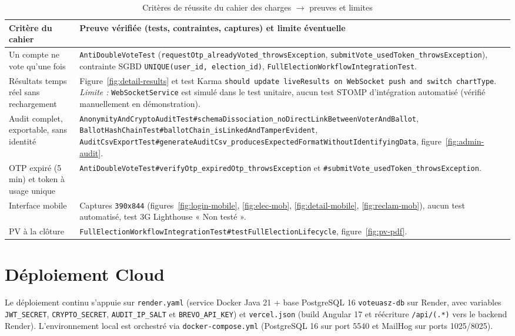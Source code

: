\begin{table}[H]
\centering
\caption{Critères de réussite du cahier des charges $\rightarrow$ preuves et limites}
\label{tab:criteres-cahier-preuve}
\small
\begin{tabularx}{\textwidth}{@{}lX@{}}
\toprule
\rowcolor{uaszlight}
\textbf{Critère du cahier} & \textbf{Preuve vérifiée (tests, contraintes, captures) et limite éventuelle} \\
\midrule
Un compte ne vote qu'une fois & \texttt{AntiDoubleVoteTest} (\texttt{requestOtp\_alreadyVoted\_throwsException}, \texttt{submitVote\_usedToken\_throwsException}), contrainte SGBD \texttt{UNIQUE(user\_id, election\_id)}, \texttt{FullElectionWorkflowIntegrationTest}. \\
Résultats temps réel sans rechargement & Figure~\ref{fig:detail-results} et test Karma \texttt{should update liveResults on WebSocket push and switch chartType}. \textit{Limite :} \texttt{WebSocketService} est simulé dans le test unitaire, aucun test STOMP d'intégration automatisé (vérifié manuellement en démonstration). \\
Audit complet, exportable, sans identité & \texttt{AnonymityAndCryptoAuditTest\#\allowbreak schemaDissociation\_\allowbreak noDirectLinkBetweenVoterAndBallot}, \texttt{BallotHashChainTest\#\allowbreak ballotChain\_isLinkedAndTamperEvident}, \texttt{AuditCsvExportTest\#\allowbreak generateAuditCsv\_\allowbreak producesExpectedFormatWithoutIdentifyingData}, figure~\ref{fig:admin-audit}. \\
OTP expiré (5\,min) et token à usage unique & \texttt{AntiDoubleVoteTest\#verifyOtp\_expiredOtp\_throwsException} et \texttt{\#submitVote\_usedToken\_throwsException}. \\
Interface mobile & Captures \texttt{390x844} (figures~\ref{fig:login-mobile}, \ref{fig:elec-mob}, \ref{fig:detail-mobile}, \ref{fig:reclam-mob}), aucun test automatisé, test 3G Lighthouse « Non testé ». \\
PV à la clôture & \texttt{FullElectionWorkflowIntegrationTest\#testFullElectionLifecycle}, figure~\ref{fig:pv-pdf}. \\
\bottomrule
\end{tabularx}
\end{table}

\section{Déploiement Cloud}

Le déploiement continu s'appuie sur \texttt{render.yaml} (service Docker Java 21 + base PostgreSQL 16 \texttt{voteuasz-db} sur Render, avec variables \texttt{JWT\_SECRET}, \texttt{CRYPTO\_SECRET}, \texttt{AUDIT\_IP\_SALT} et \texttt{BREVO\_API\_KEY}) et \texttt{vercel.json} (build Angular 17 et réécriture \texttt{/api/(.*)} vers le backend Render). L'environnement local est orchestré via \texttt{docker-compose.yml} (PostgreSQL 16 sur port 5540 et MailHog sur ports 1025/8025).

